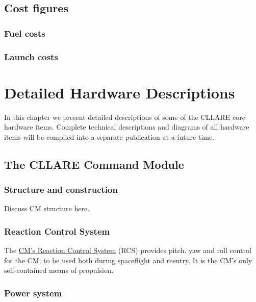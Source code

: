 \documentclass{report}
\begin{document}
\section{Cost figures}

\subsection{Fuel costs}

\subsection{Launch costs}


\chapter{Detailed Hardware Descriptions} \label{chap:detailed}

In this chapter we present detailed descriptions of some of the CLLARE core hardware items.  Complete technical descriptions and diagrams of all hardware items will be compiled into a separate publication at a future time.

\section{The CLLARE Command Module}

\subsection{Structure and construction}

Discuss CM structure here.

\subsection{Reaction Control System}

The \href{http://cstart.org/wiki/CLLARE_CM_Reaction_Control_System}{CM's Reaction Control System} (RCS) provides pitch, yaw and roll control for the CM, to be used both during spaceflight and reentry. It is the CM's only self-contained means of propulsion.

\subsection{Power system}
\end{document}
